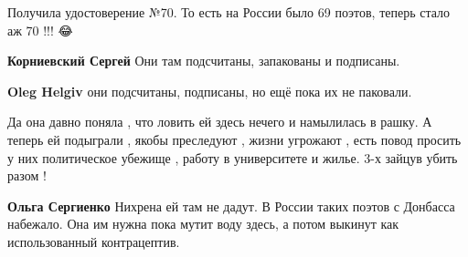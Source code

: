 \begin{itemize}
 
Получила удостоверение №70. То есть на России было 69 поэтов, теперь стало аж 70 !!!
😂

\begin{itemize}
 
\textbf{Корниевский Сергей} Они там подсчитаны, запакованы и подписаны.

 
\textbf{Oleg Helgiv} они подсчитаны, подписаны, но ещё пока их не паковали.
\end{itemize}

 

Да она давно поняла , что ловить ей здесь нечего и намылилась в рашку. А теперь
ей подыграли , якобы преследуют , жизни угрожают , есть повод просить у них
политическое убежище , работу в университете и жилье. 3-х зайцув убить разом !

\begin{itemize}
 
\textbf{Ольга Сергиенко} Нихрена ей там не дадут. В России таких поэтов с Донбасса набежало. Она им нужна пока мутит воду здесь, а потом выкинут как использованный контрацептив.

 

\end{itemize}
\end{itemize}
